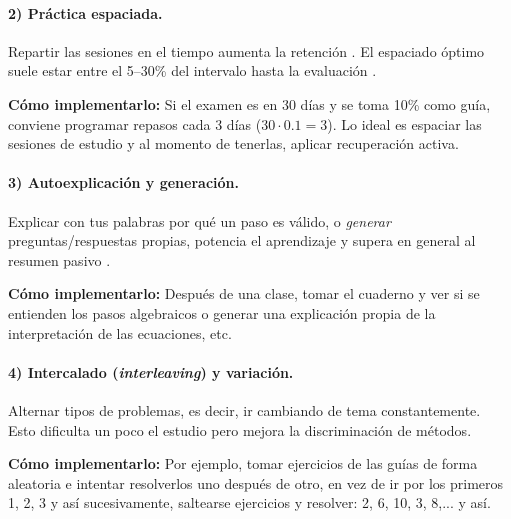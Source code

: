 \documentclass{article}
\begin{document}
\paragraph{\color{teal}2) Práctica espaciada.}
Repartir las sesiones en el tiempo aumenta la retención \cite{Bahrick1979,Cepeda2006}. El espaciado óptimo suele estar entre el 5–30\% del intervalo hasta la evaluación \cite{RohrerPashler2007,Cepeda2008}. 
\vspace{3pt}

\textbf{\color{teal}Cómo implementarlo:} Si el examen es en 30 días y se toma 10\% como guía, conviene programar repasos cada 3 días ($30\cdot 0.1=3$). Lo ideal es espaciar las sesiones de estudio y al momento de tenerlas, aplicar recuperación activa.

\paragraph{\color{teal}3) Autoexplicación y generación.}
Explicar con tus palabras por qué un paso es válido, o \emph{generar} preguntas/respuestas propias, potencia el aprendizaje y supera en general al resumen pasivo \cite{King1992,Weinstein2010}. 
\vspace{3pt}

\textbf{\color{teal}Cómo implementarlo:} Después de una clase, tomar el cuaderno y ver si se entienden los pasos algebraicos o generar una explicación propia de la interpretación de las ecuaciones, etc.

\paragraph{\color{teal}4) Intercalado (\emph{interleaving}) y variación.}
Alternar tipos de problemas, es decir, ir cambiando de tema constantemente. Esto dificulta un poco el estudio pero mejora la discriminación de métodos. 
\vspace{3pt}

\textbf{\color{teal}Cómo implementarlo:} Por ejemplo, tomar ejercicios de las guías de forma aleatoria e intentar resolverlos uno después de otro, en vez de ir por los primeros 1, 2, 3 y así sucesivamente, saltearse ejercicios y resolver: 2, 6, 10, 3, 8,... y así.
\end{document}
